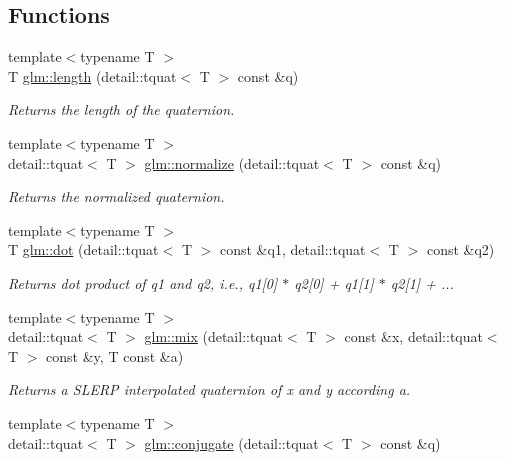 \subsection*{Functions}
\begin{DoxyCompactItemize}
\item 
{\footnotesize template$<$typename T $>$ }\\T \hyperlink{group__gtc__quaternion_ga60d5647f87c2c423497d0f3bf8c407b8}{glm\-::length} (detail\-::tquat$<$ T $>$ const \&q)
\begin{DoxyCompactList}\small\item\em Returns the length of the quaternion. \end{DoxyCompactList}\item 
{\footnotesize template$<$typename T $>$ }\\detail\-::tquat$<$ T $>$ \hyperlink{group__gtc__quaternion_gabd269bb967469a6f1df5963455fee6be}{glm\-::normalize} (detail\-::tquat$<$ T $>$ const \&q)
\begin{DoxyCompactList}\small\item\em Returns the normalized quaternion. \end{DoxyCompactList}\item 
{\footnotesize template$<$typename T $>$ }\\T \hyperlink{group__gtc__quaternion_gab9101d7f5b27ca682fc84e32b8fd70ad}{glm\-::dot} (detail\-::tquat$<$ T $>$ const \&q1, detail\-::tquat$<$ T $>$ const \&q2)
\begin{DoxyCompactList}\small\item\em Returns dot product of q1 and q2, i.\-e., q1\mbox{[}0\mbox{]} $\ast$ q2\mbox{[}0\mbox{]} + q1\mbox{[}1\mbox{]} $\ast$ q2\mbox{[}1\mbox{]} + ... \end{DoxyCompactList}\item 
{\footnotesize template$<$typename T $>$ }\\detail\-::tquat$<$ T $>$ \hyperlink{group__gtc__quaternion_gaaea9592fd53952b636d680321edcdb31}{glm\-::mix} (detail\-::tquat$<$ T $>$ const \&x, detail\-::tquat$<$ T $>$ const \&y, T const \&a)
\begin{DoxyCompactList}\small\item\em Returns a S\-L\-E\-R\-P interpolated quaternion of x and y according a. \end{DoxyCompactList}\item 
{\footnotesize template$<$typename T $>$ }\\detail\-::tquat$<$ T $>$ \hyperlink{group__gtc__quaternion_ga8b6594dffb8bf455d848ffa2169ba41d}{glm\-::conjugate} (detail\-::tquat$<$ T $>$ const \&q)

\end{DoxyCompactItemize}
